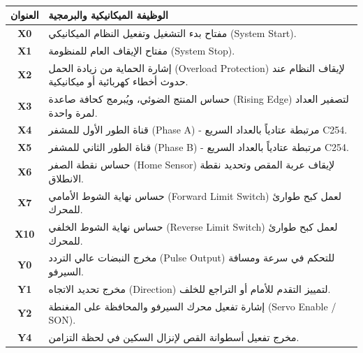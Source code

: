 \begin{table}[h!]
\centering
\renewcommand{\arraystretch}{1.5}
\begin{tabular}{|c|p{11cm}|}
\hline
\rowcolor{gray!20}
\textbf{العنوان} & \textbf{الوظيفة الميكانيكية والبرمجية} \\
\hline
\textbf{X0} & مفتاح بدء التشغيل وتفعيل النظام الميكانيكي \textenglish{(System Start)}. \\
\hline
\textbf{X1} & مفتاح الإيقاف العام للمنظومة \textenglish{(System Stop)}. \\
\hline
\textbf{X2} & إشارة الحماية من زيادة الحمل \textenglish{(Overload Protection)} لإيقاف النظام عند حدوث أخطاء كهربائية أو ميكانيكية. \\
\hline
\textbf{X3} & حساس المنتج الضوئي، ويُبرمج كحافة صاعدة \textenglish{(Rising Edge)} لتصفير العداد لمرة واحدة. \\
\hline
\textbf{X4} & قناة الطور الأول للمشفر \textenglish{(Phase A)} - مرتبطة عتادياً بالعداد السريع \textenglish{C254}. \\
\hline
\textbf{X5} & قناة الطور الثاني للمشفر \textenglish{(Phase B)} - مرتبطة عتادياً بالعداد السريع \textenglish{C254}. \\
\hline
\textbf{X6} & حساس نقطة الصفر \textenglish{(Home Sensor)} لإيقاف عربة المقص وتحديد نقطة الانطلاق. \\
\hline
\textbf{X7} & حساس نهاية الشوط الأمامي \textenglish{(Forward Limit Switch)} لعمل كبح طوارئ للمحرك. \\
\hline
\textbf{X10} & حساس نهاية الشوط الخلفي \textenglish{(Reverse Limit Switch)} لعمل كبح طوارئ للمحرك. \\
\hline
\textbf{Y0} & مخرج النبضات عالي التردد \textenglish{(Pulse Output)} للتحكم في سرعة ومسافة السيرفو. \\
\hline
\textbf{Y1} & مخرج تحديد الاتجاه \textenglish{(Direction)} لتمييز التقدم للأمام أو التراجع للخلف. \\
\hline
\textbf{Y2} & إشارة تفعيل محرك السيرفو والمحافظة على المغنطة \textenglish{(Servo Enable / SON)}. \\
\hline
\textbf{Y4} & مخرج تفعيل أسطوانة القص لإنزال السكين في لحظة التزامن. \\
\hline
\end{tabular}
\caption{}
\label{tab:io_mapping}
\end{table}
